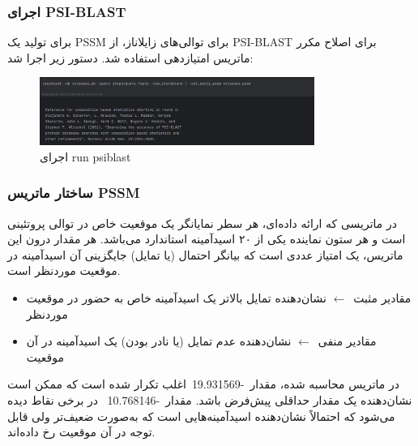             \subsubsection*{اجرای PSI-BLAST}
            برای تولید یک PSSM برای توالی‌های زایلاناز، از PSI-BLAST برای اصلاح مکرر ماتریس امتیازدهی استفاده شد. دستور زیر اجرا شد:
            \begin{figure}[H]
                \centering
                \includegraphics[width=0.8\textwidth]{images/run_psiblast.png} %
                \caption{اجرای run psiblast}
                \label{fig:run_psiblast}
            \end{figure}

            \subsubsection*{ساختار ماتریس  PSSM}
            در ماتریسی که ارائه داده‌ای، هر سطر نمایانگر یک موقعیت خاص در توالی پروتئینی است و هر ستون نماینده یکی از ۲۰ اسیدآمینه استاندارد 
            می‌باشد. هر مقدار درون این ماتریس، یک امتیاز عددی است که بیانگر احتمال (یا تمایل) جایگزینی آن اسیدآمینه در موقعیت موردنظر است.
            \begin{itemize}
                \item مقادیر مثبت $\leftarrow$ نشان‌دهنده تمایل بالاتر یک اسیدآمینه خاص به حضور در موقعیت موردنظر
                \item مقادیر منفی $\leftarrow$ نشان‌دهنده عدم تمایل (یا نادر بودن) یک اسیدآمینه در آن موقعیت
            \end{itemize}

            در ماتریس محاسبه شده، مقدار -19.931569 اغلب تکرار شده است که ممکن است نشان‌دهنده یک مقدار حداقلی پیش‌فرض باشد. مقدار -10.768146  در برخی نقاط دیده می‌شود که احتمالاً نشان‌دهنده اسیدآمینه‌هایی است که به‌صورت ضعیف‌تر ولی قابل توجه در آن موقعیت رخ داده‌اند.

